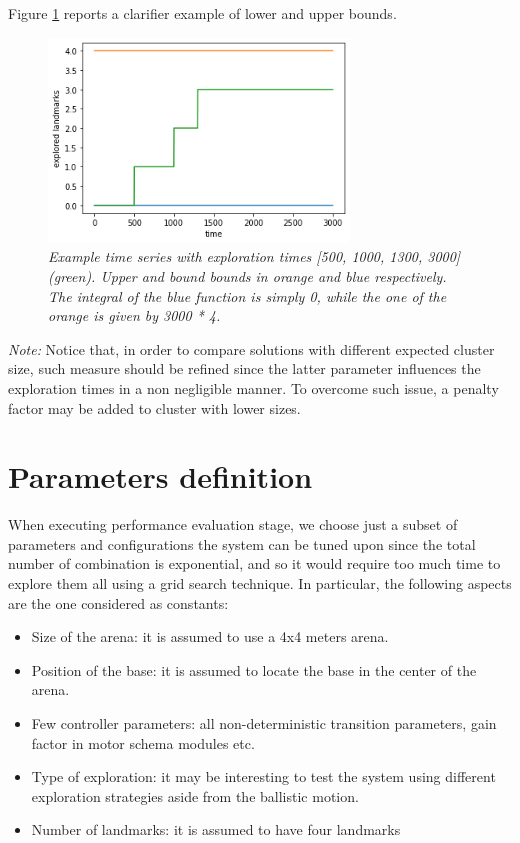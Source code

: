 \noindent 
Figure \ref{fig:auc} reports a clarifier example of lower and upper bounds.  

\begin{figure}[H]
\centering
\includegraphics[width=8cm, keepaspectratio]{images/auc.png}
\caption{\textit{Example time series with exploration times [500, 1000, 1300, 3000] (green). Upper and bound bounds in orange and blue respectively. The integral of the blue function is simply 0, while the one of the orange is given by 3000 * 4.}}
\label{fig:auc}
\end{figure}

\noindent
\textit{Note:} Notice that, in order to compare solutions with different expected cluster size, such measure should be refined  since the latter parameter influences the exploration times in a non negligible manner. To overcome such issue, a penalty factor may be added to cluster with lower sizes. 

\section{Parameters definition}

When executing performance evaluation stage, we choose just a subset of parameters and configurations the system can be tuned upon since the total number of combination is exponential, and so it would require too much time to explore them all using a grid search technique. In particular, the following aspects are the one considered as constants:

\begin{itemize}

  \item Size of the arena: it is assumed to use a 4x4 meters arena.
  \item Position of the base: it is assumed to locate the base in the center of the arena.
  \item Few controller parameters: all non-deterministic transition parameters, gain factor in motor schema modules etc.
  \item Type of exploration: it may be interesting to test the system using different exploration strategies aside from the ballistic motion.
  \item Number of landmarks: it is assumed to have four landmarks  

\end{itemize} 

